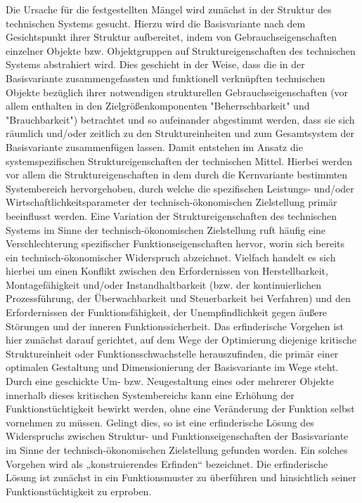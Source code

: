 \documentclass[12pt,a4paper]{article}
\begin{document}
Die Ursache für die festgestellten Mängel wird zunächst in der Struktur des technischen Systems gesucht. Hierzu wird die Basisvariante nach dem Gesichtspunkt ihrer Struktur aufbereitet, indem von Gebrauchseigenschaften einzelner Objekte bzw. Objektgruppen auf Struktureigenschaften des technischen Systems abstrahiert wird. Dies geschieht in der Weise, dass die in der Basisvariante zusammengefassten und funktionell verknüpften technischen Objekte bezüglich ihrer notwendigen strukturellen Gebrauchseigenschaften (vor allem enthalten in den Zielgrößenkomponenten "Beherrschbarkeit" und "Brauchbarkeit") betrachtet und so aufeinander abgestimmt werden, dass sie sich räumlich und/oder zeitlich zu den Struktureinheiten und zum Gesamtsystem der Basisvariante zusammenfügen lassen. Damit entstehen im Ansatz die systemspezifischen Struktureigenschaften der technischen Mittel. Hierbei werden vor allem die Struktureigenschaften in dem durch die Kernvariante bestimmten Systembereich hervorgehoben, durch welche die spezifischen Leistungs- und/oder Wirtschaftlichkeitsparameter der technisch-öko­nomischen Zielstellung primär beeinflusst werden. Eine Variation der Struktureigenschaften des technischen Systems im Sinne der technisch-ökonomischen Zielstellung ruft häufig eine Verschlechterung spezifischer Funktionseigenschaften hervor, worin sich bereits ein technisch-ökonomischer Widerspruch abzeichnet. Vielfach handelt es sich hierbei um einen Konflikt zwischen den Erfordernissen von Herstellbarkeit, Montagefähigkeit und/oder Instandhaltbarkeit (bzw. der kontinuierlichen Prozessführung, der Überwachbarkeit und Steuerbarkeit bei Verfahren) und den Erfordernissen der Funktionsfähigkeit, der Unempfindlichkeit gegen äußere Störungen und der inneren Funktionssicherheit. Das erfinderische Vorgehen ist hier zunächst darauf gerichtet, auf dem Wege der Optimierung diejenige kritische Struktureinheit oder Funktionsschwachstelle herauszufinden, die primär einer optimalen Gestaltung und Dimensionierung der Basisvariante im Wege steht. Durch eine geschickte Um- bzw. Neugestaltung eines oder mehrerer Objekte innerhalb dieses kritischen Systembereichs kann eine Erhöhung der Funktionstüchtigkeit bewirkt werden, ohne eine Veränderung der Funktion selbst vornehmen zu müssen. Gelingt dies, so ist eine erfinderische Lösung des Widerspruchs zwischen Struktur- und Funktionseigenschaften der Basisvariante im Sinne der technisch-ökonomischen Zielstellung gefunden worden. Ein solches Vorgehen wird als „konstruierendes Erfinden“ bezeichnet. Die erfinderische Lösung ist zunächst in ein Funktionsmuster zu überführen und hinsichtlich seiner Funktionstüchtigkeit zu erproben.
\end{document}
